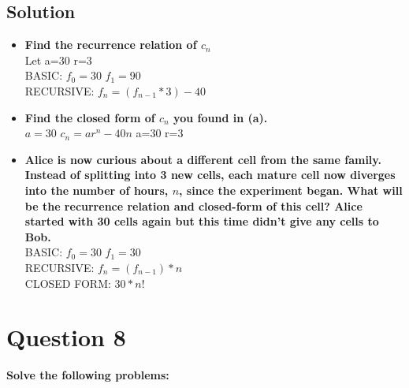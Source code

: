 \documentclass[11pt]{article}
\begin{document}
    \subsection*{Solution}
    \begin{itemize}
        \item \textbf{Find the recurrence relation of \(c_{n}\)} \\
        Let a=30 r=3 \\
        BASIC: \(f_{0}=30\) \(f_{1} = 90\) \\
        RECURSIVE: \(f_{n}=(f_{n-1} *3) -40\)
        \item \textbf{Find the closed form of \(c_{n}\) you found in (a).} \\
        \(a= 30\) \(c_{n}=ar^n -40n\) a=30 r=3
        \item \textbf{Alice is now curious about a different cell from the same family. Instead of splitting into 3 new cells, each mature cell now diverges into the number of hours, \(n\), since the experiment began. What will be the recurrence relation and closed-form of this cell? Alice started with 30 cells again but this time didn’t give any cells to Bob.} \\
        BASIC: \(f_{0}=30\) \(f_{1}=30\) \\
        RECURSIVE: \(f_{n}=(f_{n-1})*n\) \\
        CLOSED FORM: \(30 * n!\)
    \end{itemize}

\clearpage
\section*{Question 8}
    \textbf{Solve the following problems:}
\end{document}
